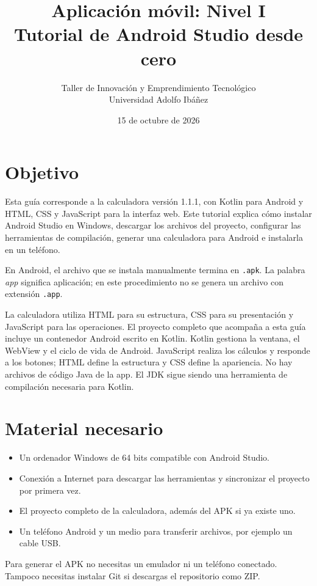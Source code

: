 \documentclass[12pt,a4paper]{article}
\title{Aplicación móvil: Nivel I\\Tutorial de Android Studio desde cero}
\author{Taller de Innovación y Emprendimiento Tecnológico\\Universidad Adolfo Ibáñez}
\date{15 de octubre de 2026}
\begin{document}
\maketitle

\section{Objetivo}

Esta guía corresponde a la calculadora versión 1.1.1, con Kotlin para Android y HTML, CSS y JavaScript para la interfaz web. Este tutorial explica cómo instalar Android Studio en Windows, descargar los archivos del proyecto, configurar las herramientas de compilación, generar una calculadora para Android e instalarla en un teléfono.

En Android, el archivo que se instala manualmente termina en \texttt{.apk}. La palabra \emph{app} significa aplicación; en este procedimiento no se genera un archivo con extensión \texttt{.app}.

La calculadora utiliza HTML para su estructura, CSS para su presentación y JavaScript para las operaciones. El proyecto completo que acompaña a esta guía incluye un contenedor Android escrito en Kotlin. Kotlin gestiona la ventana, el WebView y el ciclo de vida de Android. JavaScript realiza los cálculos y responde a los botones; HTML define la estructura y CSS define la apariencia. No hay archivos de código Java de la app. El JDK sigue siendo una herramienta de compilación necesaria para Kotlin.

\section{Material necesario}

\begin{itemize}
    \item Un ordenador Windows de 64 bits compatible con Android Studio.
    \item Conexión a Internet para descargar las herramientas y sincronizar el proyecto por primera vez.
    \item El proyecto completo de la calculadora, además del APK si ya existe uno.
    \item Un teléfono Android y un medio para transferir archivos, por ejemplo un cable USB.
\end{itemize}

Para generar el APK no necesitas un emulador ni un teléfono conectado. Tampoco necesitas instalar Git si descargas el repositorio como ZIP.
\end{document}
